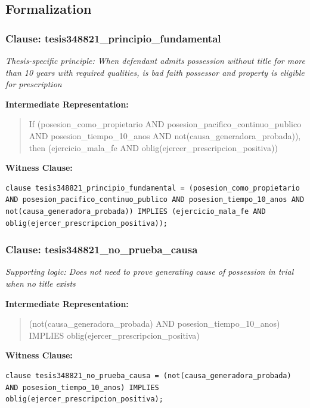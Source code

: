 \documentclass[11pt,a4paper]{article}
\begin{document}
\subsection{Formalization}

\subsubsection{Clause: tesis348821\_principio\_fundamental}

\textit{Thesis-specific principle: When defendant admits possession without title for more than 10 years with required qualities, is bad faith possessor and property is eligible for prescription}

\textbf{Intermediate Representation:}

\begin{quote}
If (posesion\_como\_propietario AND posesion\_pacifico\_continuo\_publico AND posesion\_tiempo\_10\_anos AND not(causa\_generadora\_probada)), then (ejercicio\_mala\_fe AND oblig(ejercer\_prescripcion\_positiva))
\end{quote}

\textbf{Witness Clause:}

\begin{lstlisting}[style=witnessstyle, language=Witness]
clause tesis348821_principio_fundamental = (posesion_como_propietario AND posesion_pacifico_continuo_publico AND posesion_tiempo_10_anos AND not(causa_generadora_probada)) IMPLIES (ejercicio_mala_fe AND oblig(ejercer_prescripcion_positiva));
\end{lstlisting}

\subsubsection{Clause: tesis348821\_no\_prueba\_causa}

\textit{Supporting logic: Does not need to prove generating cause of possession in trial when no title exists}

\textbf{Intermediate Representation:}

\begin{quote}
(not(causa\_generadora\_probada) AND posesion\_tiempo\_10\_anos) IMPLIES oblig(ejercer\_prescripcion\_positiva)
\end{quote}

\textbf{Witness Clause:}

\begin{lstlisting}[style=witnessstyle, language=Witness]
clause tesis348821_no_prueba_causa = (not(causa_generadora_probada) AND posesion_tiempo_10_anos) IMPLIES oblig(ejercer_prescripcion_positiva);
\end{lstlisting}
\end{document}
